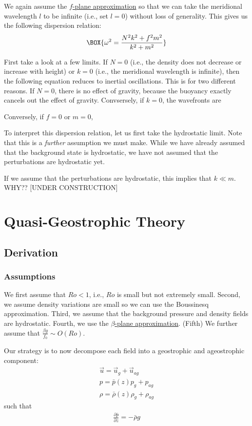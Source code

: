 We again assume the \hyperref[f plane box]{$f$-plane approximation} so that we can take the meridional wavelength $l$ to be infinite (i.e., set $l=0$) without loss of generality. This gives us the following dispersion relation:
\begin{align}
    \BOX{\omega^2 = \frac{N^2  k^2   + f^2 m^2}{k^2 + m^2}}
\end{align}

First take a look at a few limits. If $N=0$ (i.e., the density does not decrease or increase with height) or $k=0$ (i.e., the meridional wavelength is infinite), then the following equation reduces to inertial oscillations. This is for two different reasons. If $N=0$, there is no effect of gravity, because the buoyancy exactly cancels out the effect of gravity. Convsersely, if $k=0$, the wavefronts are 

Conversely, if $f=0$ or $m=0$, 

To interpret this dispersion relation, let us first take the hydrostatic limit. Note that this is a \textit{further} assumption we must make. While we have already assumed that the background state is hydrostatic, we have not assumed that the perturbations are hydrostatic yet. 

If we assume that the perturbations are hydrostatic, this implies that $k\ll m$. WHY?? [UNDER CONSTRUCTION]

\section{Quasi-Geostrophic Theory}\label{QG}



\subsection{Derivation}

\subsubsection{Assumptions}

We first assume that $Ro<1$, i.e., $Ro$ is small but not extremely small. Second, we assume density variations are small so we can use the Boussinesq approximation. Third, we assume that the background pressure and density fields are hydrostatic. Fourth, we use the \hyperref[beta plane box]{$\beta$-plane approximation}. (Fifth) We further assume that $\frac{\beta y}{f_0}\sim O(Ro)$.

Our strategy is to now decompose each field into a geostrophic and ageostrophic component:
\begin{align*}
    \vec{u} = \vec{u}_g + \vec{u}_{ag}
    \\
    p = \bar{p}(z) p_g + p_{ag}
    \\
    \rho = \bar{\rho}(z) \rho_g + \rho_{ag}
\end{align*}
such that
\begin{align*}
    \frac{\partial \bar{p}}{\partial z} = -\bar{\rho}g
\end{align*}

